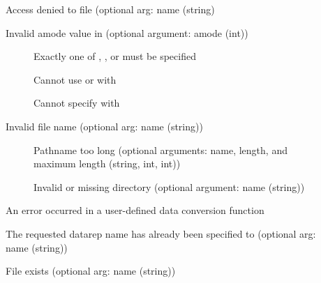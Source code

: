 \begin{description}
\item[]Access denied to file (optional arg: name (string)
\item[]Invalid amode value in 
  (optional argument: amode (int))
    \begin{description}
    \item[]Exactly one of
      , , or
       must be specified
    \item[]Cannot use
       or  with
    \item[]Cannot specify
       with 
    \end{description}
\item[]Invalid file name (optional arg: name
  (string)) 
    \begin{description}
    \item[]Pathname too long (optional
      arguments: name, length, and maximum length (string, int, int))
    \item[]Invalid or missing directory
      (optional argument: name (string))
    \end{description}
\item[]An error occurred in a user-defined data
  conversion function
\item[]The requested datarep name has already
  been specified to  (optional arg: name
  (string))
\item[]File exists (optional arg: name (string))

\end{description}
